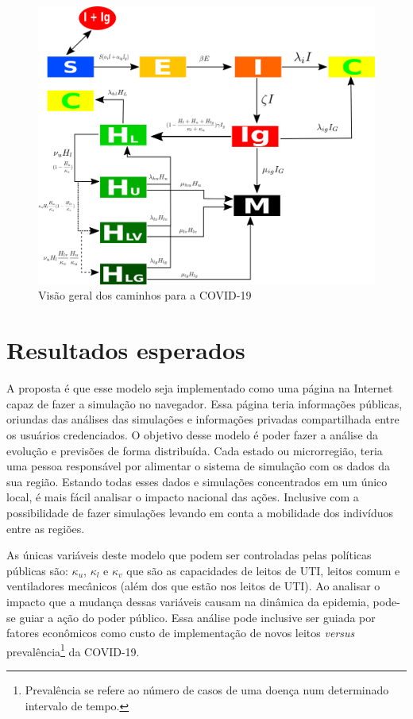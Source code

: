 \documentclass[12pt,a4papper]{article}
\begin{document}
\begin{figure}[!h]
\label{covid}
	\centering
	\includegraphics[scale=0.4]{covid}
	\caption{Visão geral dos caminhos para a COVID-19}
	\label{fig:universe}
\end{figure}




\section{Resultados esperados}

A proposta é que esse modelo seja implementado como uma página na Internet capaz de fazer a simulação no navegador. Essa página teria informações públicas, oriundas das análises das simulações e informações privadas compartilhada entre os usuários credenciados. O objetivo desse modelo é poder fazer a análise da evolução e previsões de forma distribuída. Cada estado ou microrregião, teria uma pessoa responsável por alimentar o sistema de simulação com os dados da sua região. Estando todas esses dados e simulações concentrados em um único local, é mais fácil analisar o impacto nacional das ações. Inclusive com a possibilidade de fazer simulações levando em conta a mobilidade dos indivíduos entre as regiões.

As únicas variáveis deste modelo que podem ser controladas pelas políticas públicas são: $\kappa_u$, $\kappa_l$ e $\kappa_v$ que são as capacidades de leitos de UTI, leitos comum e ventiladores mecânicos (além dos que estão nos leitos de UTI). Ao analisar o impacto que a mudança dessas variáveis causam na dinâmica da epidemia, pode-se guiar a ação do poder público. Essa análise pode inclusive ser guiada por fatores econômicos como custo de implementação de novos leitos \textit{versus} prevalência\footnote{Prevalência se refere ao número de casos de uma doença num determinado intervalo de tempo.} da COVID-19.
\end{document}
